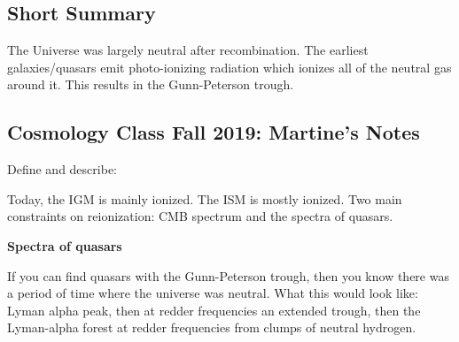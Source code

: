 \documentclass[\main/main.tex]{subfiles}
\begin{document}
    \subsection{Short Summary}
        The Universe was largely neutral after recombination. The earliest galaxies/quasars emit photo-ionizing radiation which ionizes all of the neutral gas around it. This results in the Gunn-Peterson trough. 


	

	

	
    \subsection{Cosmology Class Fall 2019: Martine's Notes}
    Define and describe:
    \par
    Today, the IGM is mainly ionized. The ISM is mostly ionized.
    Two main constraints on reionization: CMB spectrum and the spectra of quasars.
    \par
    \textbf{Spectra of quasars}
    \par
    If you can find quasars with the Gunn-Peterson trough, then you know there was a period of time where the universe was neutral.
    What this would look like: Lyman alpha peak, then at redder frequencies an extended trough, then the Lyman-alpha forest at redder frequencies from clumps of neutral hydrogen.
    
\end{document}
